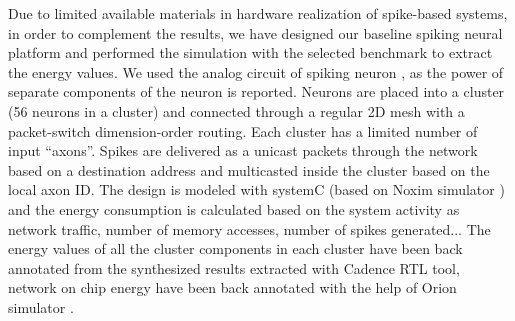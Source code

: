 \documentclass[conference, compsoc]{IEEEtran}
\begin{document}
Due to limited available materials in hardware realization of spike-based systems, in order to complement the results, we have designed our baseline spiking neural platform and performed the simulation with the selected benchmark to extract the energy values. We used the analog circuit of spiking neuron \cite{Phong}, as the power of separate components of the neuron is reported. Neurons are placed into a cluster (56 neurons in a cluster) and connected through a regular 2D mesh with a packet-switch dimension-order routing. Each cluster has a limited number of input “axons”. Spikes are delivered as a unicast packets through the network based on a destination address and multicasted inside the cluster based on the local axon ID. The design is modeled with systemC (based on Noxim simulator \cite{NOXIM}) and the energy consumption is calculated based on the system activity as network traffic, number of memory accesses, number of spikes generated... The energy values of all the cluster components in each cluster have been back annotated from the synthesized results extracted with Cadence RTL tool, network on chip energy have been back annotated with the help of Orion simulator \cite{Orion}.
\end{document}
